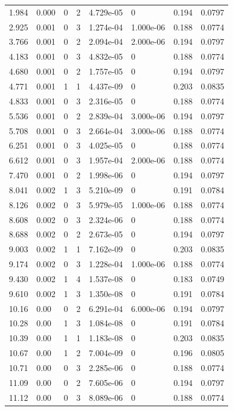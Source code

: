 \documentclass[preview]{standalone}
\begin{document}
{{\begin{tabular}{L{1.2cm}C{1.2cm} C{0.3cm}C{0.5cm} C{1.4cm}C{1.4cm} C{1.4cm}C{1.4cm}}
  1.984  &  0.000  & 0     &  2 &  4.729e-05  & 0  & 0.194 &  0.0797   \\ 
  2.925  &  0.001  & 0     &  3 &  1.274e-04  & 1.000e-06  & 0.188 &  0.0774   \\ 
  3.766  &  0.001  & 0     &  2 &  2.094e-04  & 2.000e-06  & 0.194 &  0.0797   \\ 
  4.183  &  0.001  & 0     &  3 &  4.832e-05  & 0  & 0.188 &  0.0774   \\ 
  4.680  &  0.001  & 0     &  2 &  1.757e-05  & 0  & 0.194 &  0.0797   \\ 
  4.771  &  0.001  & 1     &  1 &  4.437e-09  & 0  & 0.203 &  0.0835   \\ 
  4.833  &  0.001  & 0     &  3 &  2.316e-05  & 0  & 0.188 &  0.0774   \\ 
  5.536  &  0.001  & 0     &  2 &  2.839e-04  & 3.000e-06  & 0.194 &  0.0797   \\ 
  5.708  &  0.001  & 0     &  3 &  2.664e-04  & 3.000e-06  & 0.188 &  0.0774   \\ 
  6.251  &  0.001  & 0     &  3 &  4.025e-05  & 0  & 0.188 &  0.0774   \\ 
  6.612  &  0.001  & 0     &  3 &  1.957e-04  & 2.000e-06  & 0.188 &  0.0774   \\ 
  7.470  &  0.001  & 0     &  2 &  1.998e-06  & 0  & 0.194 &  0.0797   \\ 
  8.041  &  0.002  & 1     &  3 &  5.210e-09  & 0  & 0.191 &  0.0784   \\ 
  8.126  &  0.002  & 0     &  3 &  5.979e-05  & 1.000e-06  & 0.188 &  0.0774   \\ 
  8.608  &  0.002  & 0     &  3 &  2.324e-06  & 0  & 0.188 &  0.0774   \\ 
  8.688  &  0.002  & 0     &  2 &  2.673e-05  & 0  & 0.194 &  0.0797   \\ 
  9.003  &  0.002  & 1     &  1 &  7.162e-09  & 0  & 0.203 &  0.0835   \\ 
  9.174  &  0.002  & 0     &  3 &  1.228e-04  & 1.000e-06  & 0.188 &  0.0774   \\ 
  9.430  &  0.002  & 1     &  4 &  1.537e-08  & 0  & 0.183 &  0.0749   \\ 
  9.610  &  0.002  & 1     &  3 &  1.350e-08  & 0  & 0.191 &  0.0784   \\ 
  10.16  &  0.00  & 0     &  2 &  6.291e-04  & 6.000e-06  & 0.194 &  0.0797   \\ 
  10.28  &  0.00  & 1     &  3 &  1.084e-08  & 0  & 0.191 &  0.0784   \\ 
  10.39  &  0.00  & 1     &  1 &  1.183e-08  & 0  & 0.203 &  0.0835   \\ 
  10.67  &  0.00  & 1     &  2 &  7.004e-09  & 0  & 0.196 &  0.0805   \\ 
  10.71  &  0.00  & 0     &  3 &  2.285e-06  & 0  & 0.188 &  0.0774   \\ 
  11.09  &  0.00  & 0     &  2 &  7.605e-06  & 0  & 0.194 &  0.0797   \\ 
  11.12  &  0.00  & 0     &  3 &  8.089e-06  & 0  & 0.188 &  0.0774   \\ 
\hline 
\end{tabular} 

}}
\end{document}
